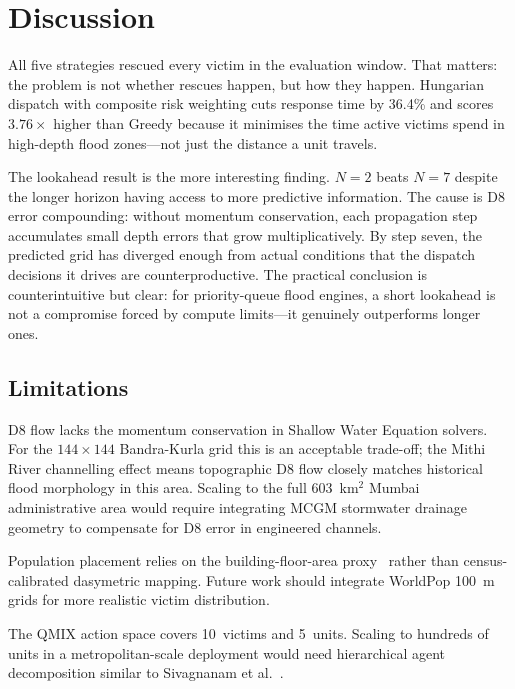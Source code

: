 \documentclass[conference]{IEEEtran}
\begin{document}
\section{Discussion}
\label{sec:disc}

All five strategies rescued every victim in the evaluation window.
That matters: the problem is not whether rescues happen, but how they happen.
Hungarian dispatch with composite risk weighting cuts response time by 36.4\%
and scores $3.76\times$ higher than Greedy because it minimises the time
active victims spend in high-depth flood zones---not just the distance a unit
travels.

The lookahead result is the more interesting finding.
$N=2$ beats $N=7$ despite the longer horizon having access to more predictive
information.
The cause is D8 error compounding: without momentum conservation, each
propagation step accumulates small depth errors that grow multiplicatively.
By step seven, the predicted grid has diverged enough from actual conditions
that the dispatch decisions it drives are counterproductive.
The practical conclusion is counterintuitive but clear: for priority-queue
flood engines, a short lookahead is not a compromise forced by compute
limits---it genuinely outperforms longer ones.

\subsection{Limitations}

D8 flow lacks the momentum conservation in Shallow Water Equation solvers.
For the $144 \times 144$ Bandra-Kurla grid this is an acceptable trade-off;
the Mithi River channelling effect means topographic D8 flow closely matches
historical flood morphology in this area.
Scaling to the full 603~km$^2$ Mumbai administrative area would require
integrating MCGM stormwater drainage geometry to compensate for D8 error
in engineered channels.

Population placement relies on the building-floor-area proxy~\cite{wardrop2018population}
rather than census-calibrated dasymetric mapping.
Future work should integrate WorldPop 100~m grids for more realistic victim
distribution.

The QMIX action space covers 10~victims and 5~units.
Scaling to hundreds of units in a metropolitan-scale deployment would need
hierarchical agent decomposition similar to Sivagnanam et al.~\cite{sivagnanam2024marl}.
\end{document}
